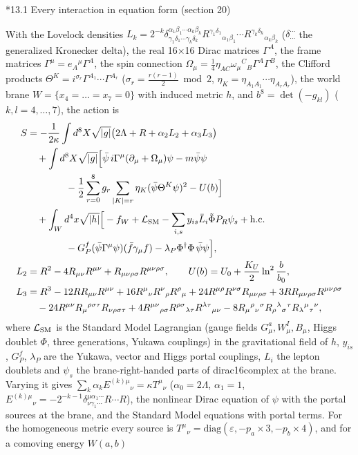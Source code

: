 \documentclass[10pt,a4paper]{article}
\makeatletter
\renewcommand\subsection{\@startsection{subsection}{2}{\z@}{-3.25ex\@plus -1ex \@minus -.2ex}{1.5ex \@plus .2ex}{\normalfont\large\bfseries\raggedright}}
\makeatother
\begin{document}
\subsection*{13.1 Every interaction in equation form (section 20)}
With the Lovelock densities $L_k=2^{-k}\delta^{\alpha_1\beta_1\cdots\alpha_k\beta_k}_{\gamma_1\delta_1\cdots\gamma_k\delta_k}R^{\gamma_1\delta_1}{}_{\alpha_1\beta_1}\cdots R^{\gamma_k\delta_k}{}_{\alpha_k\beta_k}$ ($\delta^{\cdots}_{\cdots}$ the generalized Kronecker delta), the real 16×16 Dirac matrices $\Gamma^A$, the frame matrices $\Gamma^\mu=e_A{}^\mu\Gamma^A$, the spin connection $\Omega_\mu=\frac14\eta_{AC}\omega_\mu{}^C{}_B\Gamma^A\Gamma^B$, the Clifford products $\Theta^K=i^{\sigma_r}\Gamma^{A_1}\cdots\Gamma^{A_r}$ ($\sigma_r=\frac{r(r-1)}2\bmod2$, $\eta_K=\eta_{A_1A_1}\cdots\eta_{A_rA_r}$), the world brane $W=\lbrace x_4=\dots=x_7=0\rbrace$ with induced metric $h$, and $b^8=\det(-g_{kl})$ ($k,l=4,\dots,7$), the action is
\begin{align*}
S&=-\frac1{2\kappa}\int d^8X\sqrt{|g|}\big(2\Lambda+R+\alpha_2L_2+\alpha_3L_3\big) \\
&\quad+\int d^8X\sqrt{|g|}\Big[\bar\psi\,i\Gamma^\mu(\partial_\mu+\Omega_\mu)\psi-m\bar\psi\psi \\
&\qquad\qquad-\frac12\sum_{r=0}^8g_r\sum_{|K|=r}\eta_K(\bar\psi\Theta^K\psi)^2-U(b)\Big] \\
&\quad+\int_Wd^4x\sqrt{|h|}\Big[-f_W+\mathcal L_{\rm SM}-\sum_{i,s}y_{is}\bar L_i\tilde\Phi P_R\psi_s+\text{h.c.} \\
&\qquad\qquad-G^f_P(\bar\psi\Gamma^\mu\psi)(\bar f\gamma_\mu f)-\lambda_P\Phi^\dagger\Phi\,\bar\psi\psi\Big], \\
L_2&=R^2-4R_{\mu\nu}R^{\mu\nu}+R_{\mu\nu\rho\sigma}R^{\mu\nu\rho\sigma},\qquad U(b)=U_0+\frac{K_U}2\ln^2\frac b{b_0}, \\
L_3&=R^3-12RR_{\mu\nu}R^{\mu\nu}+16R^\mu{}_\nu R^\nu{}_\rho R^\rho{}_\mu+24R^{\mu\rho}R^{\nu\sigma}R_{\mu\nu\rho\sigma}+3RR_{\mu\nu\rho\sigma}R^{\mu\nu\rho\sigma} \\
&\quad-24R^{\mu\nu}R_\mu{}^{\rho\sigma\tau}R_{\nu\rho\sigma\tau}+4R^{\mu\nu}{}_{\rho\sigma}R^{\rho\sigma}{}_{\lambda\tau}R^{\lambda\tau}{}_{\mu\nu}-8R_\mu{}^\rho{}_\nu{}^\sigma R_\rho{}^\lambda{}_\sigma{}^\tau R_\lambda{}^\mu{}_\tau{}^\nu,
\end{align*}
where $\mathcal L_{\rm SM}$ is the Standard Model Lagrangian (gauge fields $G^a_\mu,W^I_\mu,B_\mu$, Higgs doublet $\Phi$, three generations, Yukawa couplings) in the gravitational field of $h$, $y_{is}$, $G^f_P$, $\lambda_P$ are the Yukawa, vector and Higgs portal couplings, $L_i$ the lepton doublets and $\psi_s$ the brane-right-handed parts of dirac16complex at the brane. Varying it gives $\sum_k\alpha_kE^{(k)\mu}{}_\nu=\kappa T^\mu{}_\nu$ ($\alpha_0=2\Lambda$, $\alpha_1=1$, $E^{(k)\mu}{}_\nu=-2^{-k-1}\delta^{\mu\alpha_1\cdots}_{\nu\gamma_1\cdots}R\cdots R$), the nonlinear Dirac equation of $\psi$ with the portal sources at the brane, and the Standard Model equations with portal terms. For the homogeneous metric every source is $T^\mu{}_\nu=\mathrm{diag}(\varepsilon,-p_a\times3,-p_b\times4)$, and for a comoving energy $W(a,b)$
\end{document}

